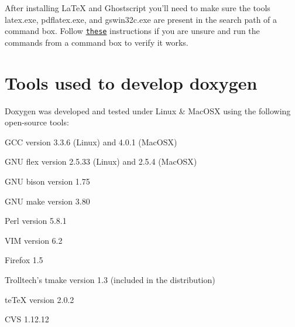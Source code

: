 After installing LaTeX and Ghostscript you'll need to make sure the tools latex.exe, pdflatex.exe, and gswin32c.exe are present in the search path of a command box. Follow \href{http://www.computerhope.com/issues/ch000549.htm}{\tt these} instructions if you are unsure and run the commands from a command box to verify it works.\hypertarget{install_build_tools}{}\section{Tools used to develop doxygen}\label{install_build_tools}
Doxygen was developed and tested under Linux \& MacOSX using the following open-\/source tools: 
\begin{DoxyItemize}
\item GCC version 3.3.6 (Linux) and 4.0.1 (MacOSX) 
\item GNU flex version 2.5.33 (Linux) and 2.5.4 (MacOSX) 
\item GNU bison version 1.75 
\item GNU make version 3.80 
\item Perl version 5.8.1 
\item VIM version 6.2 
\item Firefox 1.5 
\item Trolltech's tmake version 1.3 (included in the distribution) 
\item teTeX version 2.0.2 
\item CVS 1.12.12 
\end{DoxyItemize}

 